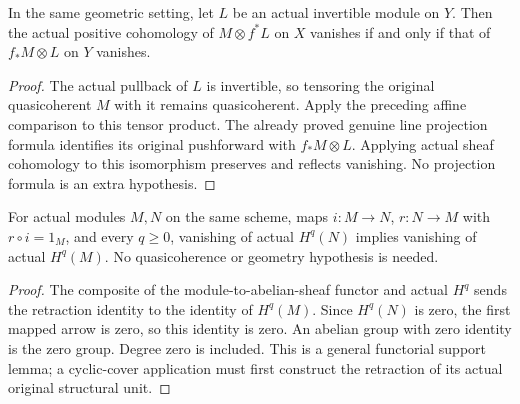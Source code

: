 \begin{theorem}
\label{thm:affine-pushforward-twisted-cohomology}
\leanok
In the same geometric setting, let $L$ be an actual invertible module
on $Y$. Then the actual positive cohomology of $M\otimes f^*L$ on $X$
vanishes if and only if that of $f_*M\otimes L$ on $Y$ vanishes.
\end{theorem}
\begin{proof}
The actual pullback of $L$ is invertible, so tensoring the original
quasicoherent $M$ with it remains quasicoherent. Apply the preceding
affine comparison to this tensor product. The already proved genuine
line projection formula identifies its original pushforward with
$f_*M\otimes L$. Applying actual sheaf cohomology to this isomorphism
preserves and reflects vanishing. No projection formula is an extra
hypothesis.
\end{proof}

\begin{lemma}
\label{lem:actual-cohomology-retract-vanishing}
\leanok
For actual modules $M,N$ on the same scheme, maps $i:M\to N$,
$r:N\to M$ with $r\circ i=1_M$, and every $q\ge0$, vanishing of
actual $H^q(N)$ implies vanishing of actual $H^q(M)$. No
quasicoherence or geometry hypothesis is needed.
\end{lemma}
\begin{proof}
The composite of the module-to-abelian-sheaf functor and actual
$H^q$ sends the retraction identity to the identity of $H^q(M)$.
Since $H^q(N)$ is zero, the first mapped arrow is zero, so this
identity is zero. An abelian group with zero identity is the zero
group. Degree zero is included. This is a general functorial support
lemma; a cyclic-cover application must first construct the retraction
of its actual original structural unit.
\end{proof}
